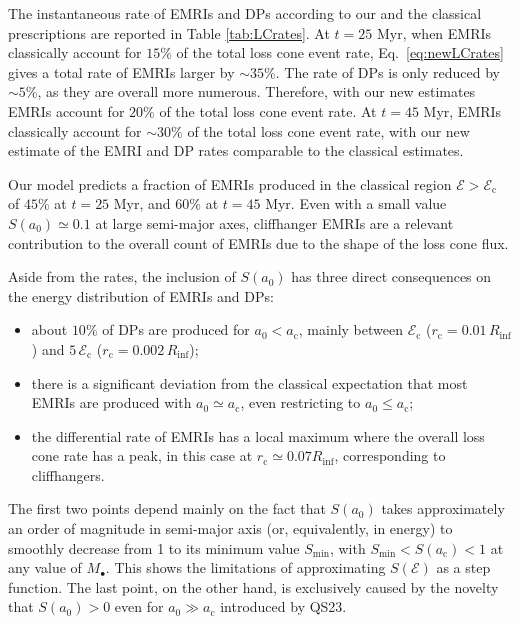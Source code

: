 \documentclass[desactivate]{aa}
\begin{document}
    The instantaneous rate of EMRIs and DPs according to our and the classical prescriptions are reported in Table \ref{tab:LCrates}. At $t=25$ Myr, when EMRIs classically account for $15\%$ of the total loss cone event rate, Eq.~\eqref{eq:newLCrates} gives a total rate of EMRIs larger by ${\sim}35\%$. The rate of DPs is only reduced by ${\sim}5\%$, as they are overall more numerous. Therefore, with our new estimates EMRIs account for $20\%$ of the total loss cone event rate. At $t=45$ Myr, EMRIs classically account for ${\sim}30\%$ of the total loss cone event rate, with our new estimate of the EMRI and DP rates comparable to the classical estimates.
    
    Our model predicts a fraction of EMRIs produced in the classical region $\mathcal{E} > \mathcal{E}_\mathrm{c}$ of $45\%$ at $t=25$ Myr, and $60\%$ at $t=45$ Myr. Even with a small value $S(a_0)\simeq 0.1$ at large semi-major axes, cliffhanger EMRIs are a relevant contribution to the overall count of EMRIs due to the shape of the loss cone flux.

    Aside from the rates, the inclusion of $S(a_0)$ has three direct consequences on the energy distribution of EMRIs and DPs:
    \begin{itemize}
        \item about $10 \%$ of DPs are produced for $a_0 < a_\mathrm{c}$, mainly between $\mathcal{E}_\mathrm{c}$ ($r_\mathrm{c} = 0.01 \, R_\mathrm{inf}$) and $5\, \mathcal{E}_\mathrm{c}$ ($r_\mathrm{c} = 0.002 \, R_\mathrm{inf}$);
        \item there is a significant deviation from the classical expectation that most EMRIs are produced with $a_0 \simeq a_\mathrm{c}$, even restricting to $a_0 \leq a_\mathrm{c}$;
        \item the differential rate of EMRIs has a local maximum where the overall loss cone rate has a peak, in this case at $r_\mathrm{c} \simeq 0.07 R_\mathrm{inf}$, corresponding to cliffhangers.
    \end{itemize}
    The first two points depend mainly on the fact that $S(a_0)$ takes approximately an order of magnitude in semi-major axis (or, equivalently, in energy) to smoothly decrease from 1 to its minimum value $S_\mathrm{min}$, with $S_\mathrm{min} < S(a_\mathrm{c}) < 1$ at any value of $M_\bullet$. This shows the limitations of approximating $S(\mathcal{E})$ as a step function. The last point, on the other hand, is exclusively caused by the novelty that $S(a_0) > 0$ even for $a_0 \gg a_\mathrm{c}$ introduced by QS23.
\end{document}
